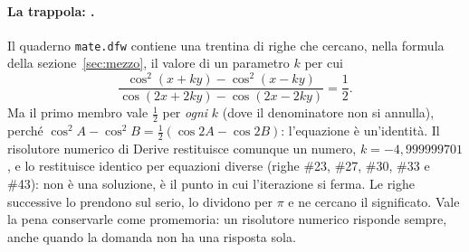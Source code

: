 \paragraph{La trappola: .}
Il quaderno \texttt{mate.dfw} contiene una trentina di righe che cercano, nella
formula della sezione~\ref{sec:mezzo}, il valore di un parametro $k$ per cui
\[
  \frac{\cos^2(x+ky)-\cos^2(x-ky)}{\cos(2x+2ky)-\cos(2x-2ky)}=\frac12 .
\]
Ma il primo membro vale $\tfrac12$ per \emph{ogni} $k$ (dove il denominatore
non si annulla), perch\'e $\cos^2 A-\cos^2 B=\tfrac12(\cos 2A-\cos 2B)$:
l'equazione \`e un'identit\`a. Il risolutore numerico di Derive restituisce
comunque un numero, $k=-4{,}999999701$, e lo restituisce identico per
equazioni diverse (righe \#23, \#27, \#30, \#33 e \#43): non \`e una
soluzione, \`e il punto in cui l'iterazione si ferma. Le righe successive lo
prendono sul serio, lo dividono per $\pi$ e ne cercano il significato. Vale
la pena conservarle come promemoria: un risolutore numerico risponde sempre,
anche quando la domanda non ha una risposta sola.
